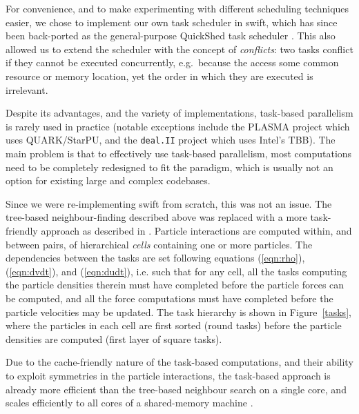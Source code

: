 \documentclass{sig-alternate-05-2015}
\newcommand{\eqn}[1] {(\ref{eqn:#1})}
\newcommand{\swift}{{\sc swift}\xspace}
\newcommand{\qs}{{\sc QuickShed}\xspace}
\begin{document}
For convenience, and to make experimenting with different scheduling
techniques easier, we chose to implement our own task scheduler
in \swift, which has since been back-ported as the general-purpose
\qs task scheduler \cite{gonnet2013quicksched}.
This also allowed us to extend the scheduler with the concept of
{\em conflicts}: two tasks conflict if they cannot be executed
concurrently, e.g.~because the access some common resource or memory
location, yet the order in which they are executed is irrelevant.

Despite its advantages, and the variety of implementations,
task-based parallelism is rarely used in
practice (notable exceptions include the PLASMA project
\cite{ref:Agullo2009} which uses QUARK/StarPU, and the {\tt deal.II} project
\cite{ref:Bangerth2007} which uses Intel's TBB).
The main problem is that to effectively use task-based parallelism,
most computations need to be completely redesigned to fit the paradigm,
which is usually not an option for existing large and complex codebases.

Since we were re-implementing \swift from scratch, this was not an issue.
The tree-based neighbour-finding described above was replaced with a more
task-friendly approach as described in \cite{gonnet2015efficient}.
Particle interactions are computed within, and between pairs, of
hierarchical {\em cells} containing one or more particles.
The dependencies between the tasks are set following
equations \eqn{rho}, \eqn{dvdt}, and \eqn{dudt}, i.e. such that for any cell,
all the tasks computing the particle densities therein must have
completed before the particle forces can be computed, and all the
force computations must have completed before the particle velocities
may be updated.
The task hierarchy is shown in Figure~\ref{tasks}, where the particles in each
cell are first sorted (round tasks) before the particle densities
are computed (first layer of square tasks).

Due to the cache-friendly nature of the task-based computations, 
and their ability to exploit symmetries in the particle interactions,
the task-based approach is already more efficient than the tree-based
neighbour search on a single core, and scales efficiently to all
cores of a shared-memory machine \cite{gonnet2015efficient}.
\end{document}
